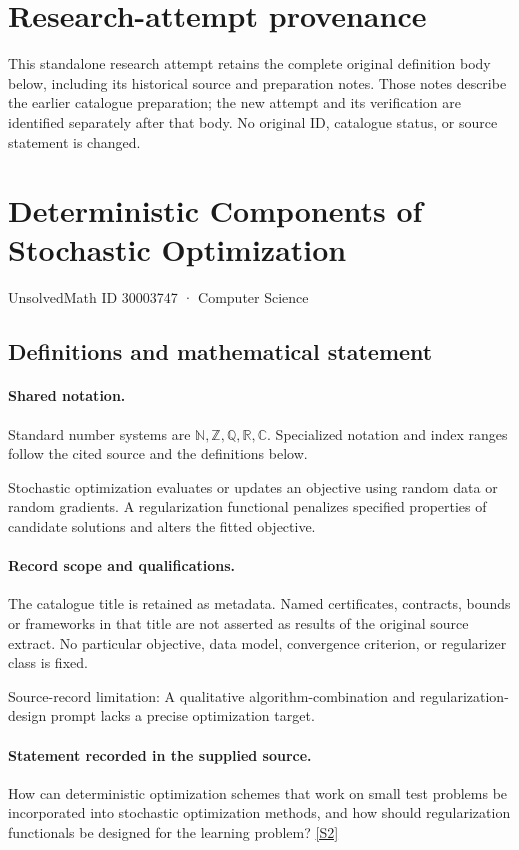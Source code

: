 \documentclass[11pt]{article}
\begin{document}
\section*{Research-attempt provenance}
This standalone research attempt retains the complete original definition body below,
including its historical source and preparation notes. Those notes describe the
earlier catalogue preparation; the new attempt and its verification are identified
separately after that body. No original ID, catalogue status, or source statement is changed.

\section{Deterministic Components of Stochastic Optimization}\label{30003747}
{\small UnsolvedMath ID 30003747 · Computer Science}
\subsection{Definitions and mathematical statement}

\paragraph{Shared notation.}Standard number systems are $\mathbb N,\mathbb Z,\mathbb Q,\mathbb R,\mathbb C$. Specialized notation and index ranges follow the cited source and the definitions below.


Stochastic optimization evaluates or updates an objective using random data or random gradients. A regularization functional penalizes specified properties of candidate solutions and alters the fitted objective.
\paragraph{Record scope and qualifications.}
The catalogue title is retained as metadata. Named certificates, contracts, bounds or frameworks in that title are not asserted as results of the original source extract.
No particular objective, data model, convergence criterion, or regularizer class is fixed.

Source-record limitation: A qualitative algorithm-combination and regularization-design prompt lacks a precise optimization target.
\paragraph{Statement recorded in the supplied source.}
How can deterministic optimization schemes that work on small test problems be incorporated into stochastic optimization methods, and how should regularization functionals be designed for the learning problem? \href{https://doi.org/10.4171/owr/2018/11}{[S2]}
\end{document}
